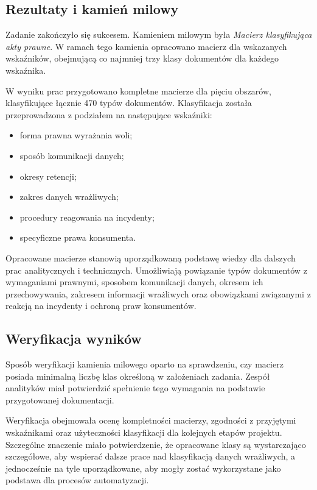 \documentclass[12pt,a4paper]{report}
\begin{document}
\subsection{Rezultaty i kamień milowy}
Zadanie zakończyło się sukcesem. Kamieniem milowym była \textit{Macierz klasyfikująca akty prawne}. W ramach tego kamienia opracowano macierz dla wskazanych wskaźników, obejmującą co najmniej trzy klasy dokumentów dla każdego wskaźnika.

W wyniku prac przygotowano kompletne macierze dla pięciu obszarów, klasyfikujące łącznie 470 typów dokumentów. Klasyfikacja została przeprowadzona z podziałem na następujące wskaźniki:

\begin{itemize}
    \item forma prawna wyrażania woli;
    \item sposób komunikacji danych;
    \item okresy retencji;
    \item zakres danych wrażliwych;
    \item procedury reagowania na incydenty;
    \item specyficzne prawa konsumenta.
\end{itemize}

Opracowane macierze stanowią uporządkowaną podstawę wiedzy dla dalszych prac analitycznych i technicznych. Umożliwiają powiązanie typów dokumentów z wymaganiami prawnymi, sposobem komunikacji danych, okresem ich przechowywania, zakresem informacji wrażliwych oraz obowiązkami związanymi z reakcją na incydenty i ochroną praw konsumentów.

\subsection{Weryfikacja wyników}
Sposób weryfikacji kamienia milowego oparto na sprawdzeniu, czy macierz posiada minimalną liczbę klas określoną w założeniach zadania. Zespół analityków miał potwierdzić spełnienie tego wymagania na podstawie przygotowanej dokumentacji.

Weryfikacja obejmowała ocenę kompletności macierzy, zgodności z przyjętymi wskaźnikami oraz użyteczności klasyfikacji dla kolejnych etapów projektu. Szczególne znaczenie miało potwierdzenie, że opracowane klasy są wystarczająco szczegółowe, aby wspierać dalsze prace nad klasyfikacją danych wrażliwych, a jednocześnie na tyle uporządkowane, aby mogły zostać wykorzystane jako podstawa dla procesów automatyzacji.
\end{document}
